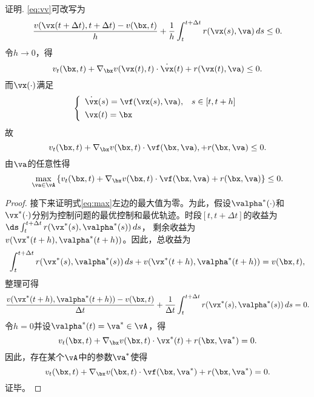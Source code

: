 \begin{frame}{\secname}  
\begin{block}{证明.}
\eqref{eq:vv}可改写为
$$
\frac{v(\vx(t+\Delta t),t+\Delta t)-v(\bx,t)}{h} + \frac1h\int_{t}^{t+\Delta t} r(\vx(s), \va)\,ds \le 0. 
$$
令$h\to 0$，得
$$
v_t(\bx, t) + \nabla_\bx v(\vx(t), t)\cdot \dot\vx(t) + r(\vx(t), \va) \le 0.
$$
而$\vx(\cdot)$满足
$$
\left\{
\begin{array}{lc}
    \dot\vx(s) = \vf(\vx(s), \va),  &  s \in [t, t+h]\\[.05in]
    \vx(t) = \bx& 
\end{array}
\right.
$$
故
$$
v_t(\bx, t) + \nabla_\bx v(\bx, t)\cdot \vf(\bx, \va), + r(\bx, \va) \le 0.
$$
由$\va$的任意性得
\begin{equation}\label{eq:max}
\max_{\va\in\vA} \left\{v_t(\bx, t) + \nabla_\bx v(\bx, t)\cdot \vf(\bx, \va) + r(\bx, \va)\right\} \le 0.    
\end{equation}
\end{block}  
\end{frame}

\begin{frame}{\secname}  
\begin{proof}
接下来证明式\eqref{eq:max}左边的最大值为零。为此，假设$\valpha^*(\cdot)$和$\vx^*(\cdot)$分别为控制问题的最优控制和最优轨迹。时段$[t,t+\Delta t]$的收益为
$\ds 
\int_{t}^{t+\Delta t} r(\vx^*(s),\valpha^*(s))\,ds
$，
剩余收益为$v(\vx^*(t+h),\valpha^*(t+h))$。因此，总收益为
$$
\int_{t}^{t+\Delta t} r(\vx^*(s),\valpha^*(s))\,ds + v(\vx^*(t+h),\valpha^*(t+h)) = v(\bx, t),
$$
整理可得
$$
\frac{v(\vx^*(t+h),\valpha^*(t+h))-v(\bx, t)}{\Delta t} + \frac{1}{\Delta t}\int_{t}^{t+\Delta t} r(\vx^*(s),\valpha^*(s))\,ds = 0.
$$
令$h=0$并设$\valpha^*(t)=\va^*\in \vA$，得
$$
v_t(\bx, t) + \nabla_\bx v(\bx, t)\cdot \vx^*(t) + r(\bx, \va^*)=0.
$$
因此，存在某个$\vA$中的参数$\va^*$使得
$$
v_t(\bx, t) + \nabla_\bx v(\bx, t)\cdot \vf(\bx,\va^*) + r(\bx, \va^*)=0.
$$
证毕。
\end{proof}  
\end{frame}

